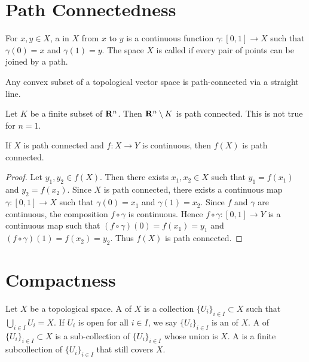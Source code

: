 \section{Path Connectedness}

\begin{definition}
    For $x,y \in X$, a  in $X$ from $x$ to $y$ is a continuous function $\gamma:[0,1] \rightarrow X$ such that $\gamma(0) = x$ and $\gamma(1) = y$. The space $X$ is called  if every pair of points can be joined by a path.
\end{definition}

\begin{example}
    Any convex subset of a topological vector space is path-connected via a straight line.
\end{example}

\begin{example}
    Let $K$ be a finite subset of $\mathbf{R}^n$. Then $\mathbf{R}^n \setminus K$ is path connected. This is not true for $n=1$.
\end{example}

\begin{proposition}
    If $X$ is path connected and $f:X \rightarrow Y$ is continuous, then $f(X)$ is path connected.
\end{proposition}
    \begin{proof}
        Let $y_1,y_2 \in f(X)$. Then there exists $x_1,x_2 \in X$ such that $y_1 = f(x_1)$ and $y_2 = f(x_2)$. Since $X$ is path connected, there exists a continuous map $\gamma:[0,1] \rightarrow X$ such that $\gamma(0) = x_1$ and $\gamma(1) = x_2$. Since $f$ and $\gamma$ are continuous, the composition $f \circ \gamma$ is continuous. Hence $f \circ \gamma:[0,1] \rightarrow Y$ is a continuous map such that $(f \circ \gamma)(0) = f(x_1) = y_1$ and $(f \circ \gamma)(1) = f(x_2) = y_2$. Thus $f(X)$ is path connected.
    \end{proof}

\section{Compactness}
\begin{definition}
    Let $X$ be a topological space. A  of $X$ is a collection $\{U_i\}_{i \in I} \subset X$ such that $\bigcup_{i \in I}U_i = X$. If $U_i$ is open for all $i \in I$, we say $\{U_i\}_{i \in I}$ is an  of $X$. A  of $\{U_i\}_{i \in I} \subset X$ is a sub-collection of $\{U_i\}_{i \in I}$ whose union is $X$. A  is a finite subcollection of $\{U_i\}_{i \in I}$ that still covers $X$.
\end{definition}

